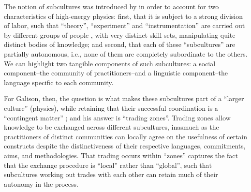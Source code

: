\documentclass[smallextended]{svjour3}
\begin{document}
The notion of subcultures was introduced by \citet{galison1987how,Galison1988} in order to account for two characteristics of high-energy physics: first, that it is subject to a strong division of labor, such that ``theory'', ``experiment'' and ``instrumentation'' are carried out by different groups of people \citep[p.~138]{galison1987how}, with very distinct skill sets, manipulating quite distinct bodies of knowledge; and second, that each of these ``subcultures'' are partially autonomous, i.e., none of them are completely subordinate to the others. We can highlight two tangible components of such subcultures: a social component--the community of practitioners--and a linguistic component--the language specific to each community.

For Galison, then, the question is what makes these subcultures part of a ``larger culture'' (physics), %
while retaining that their successful coordination is a ``contingent matter'' \citep[p.~18]{galison1997image}; and his answer is ``trading zones''. Trading zones allow knowledge to be exchanged across different subcultures, inasmuch as the practitioners of distinct communities can locally agree on the usefulness of certain constructs despite the distinctiveness of their respective languages, commitments, aims, and methodologies. That trading occurs within ``zones'' captures the fact that the exchange procedure is  ``local'' rather than ``global'', such that subcultures working out trades with each other can retain much of their autonomy in the process.%
\end{document}
